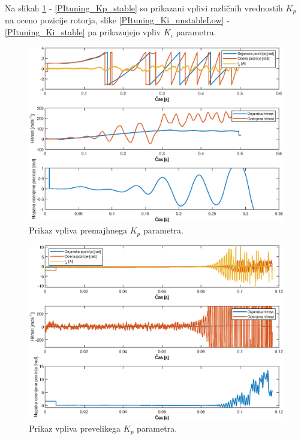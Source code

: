 \documentclass[a4paper,twoside,openright,12pt,slovene]{book}
\begin{document}
\appendix

Na slikah \ref{PItuning_Kp_unstableLow} - \ref{PItuning_Kp_stable} so prikazani vplivi različnih vrednostih $K_p$ na oceno pozicije rotorja, slike \ref{PItuning_Ki_unstableLow} -
\ref{PItuning_Ki_stable} pa prikazujejo vpliv $K_i$ parametra.

\begin{figure}[!htbp]
    \centering
    \includegraphics[width=1\columnwidth]{Slike/PItuning_Kp_unstableLow.eps}
    \caption{\label{PItuning_Kp_unstableLow} Prikaz vpliva premajhnega $K_p$ parametra. }
\end{figure}

\begin{figure}[!htbp]
    \centering
    \includegraphics[width=1\columnwidth]{Slike/PItuning_Kp_unstableHigh.eps}
    \caption{\label{PItuning_Kp_unstableHigh} Prikaz vpliva prevelikega $K_p$ parametra. }
\end{figure}
\end{document}
